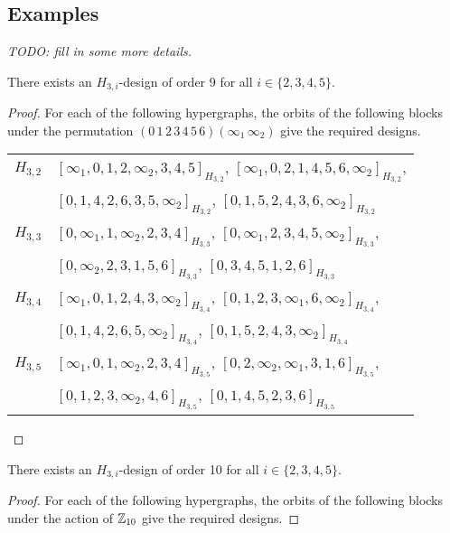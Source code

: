 \begin{subappendices}

\section{Examples}

{\em TODO: fill in some more details.}

\begin{example} \label{eg:H_3i-9}
There exists an $H_{3,i}$-design of order 9 for all $i \in \{2,3,4,5\}$.
\end{example}

\begin{proof}
For each of the following hypergraphs, the orbits of the following blocks under
the permutation $(0 \, 1 \, 2 \, 3 \, 4 \, 5 \, 6)(\infty_1 \, \infty_2)$ give the required designs.

\begin{tabular}{|c|l|}
\hline
$H_{3,2}$ &
  $[\infty_1, 0, 1, 2, \infty_2, 3, 4, 5]_{H_{3,2}}$,
  $[\infty_1, 0, 2, 1, 4, 5, 6, \infty_2]_{H_{3,2}}$, \\ &
  $[0, 1, 4, 2, 6, 3, 5, \infty_2]_{H_{3,2}}$,
  $[0, 1, 5, 2, 4, 3, 6, \infty_2]_{H_{3,2}}$
\\ \hline
$H_{3,3}$ &
  $[0, \infty_1, 1, \infty_2, 2, 3, 4]_{H_{3,3}}$,
  $[0, \infty_1, 2, 3, 4, 5, \infty_2]_{H_{3,3}}$, \\ &
  $[0, \infty_2, 2, 3, 1, 5, 6]_{H_{3,3}}$,
  $[0, 3, 4, 5, 1, 2, 6]_{H_{3,3}}$
\\ \hline
$H_{3,4}$ &
  $[\infty_1, 0, 1, 2, 4, 3, \infty_2]_{H_{3,4}}$,
  $[0, 1, 2, 3, \infty_1, 6, \infty_2]_{H_{3,4}}$, \\ &
  $[0, 1, 4, 2, 6, 5, \infty_2]_{H_{3,4}}$,
  $[0, 1, 5, 2, 4, 3, \infty_2]_{H_{3,4}}$
\\ \hline
$H_{3,5}$ &
  $[\infty_1, 0, 1, \infty_2, 2, 3, 4]_{H_{3,5}}$,
  $[0, 2, \infty_2, \infty_1, 3, 1, 6]_{H_{3,5}}$, \\ &
  $[0, 1, 2, 3, \infty_2, 4, 6]_{H_{3,5}}$,
  $[0, 1, 4, 5, 2, 3, 6]_{H_{3,5}}$
\\ \hline
\end{tabular}
\end{proof}


\begin{example} \label{eg:H_3i-10}
There exists an $H_{3,i}$-design of order 10 for all $i \in \{2,3,4,5\}$.
\end{example}

\begin{proof}
For each of the following hypergraphs, the orbits of the following blocks under
the action of $\mathbb{Z}_{10}$ give the required designs.


\end{proof}
\end{subappendices}

